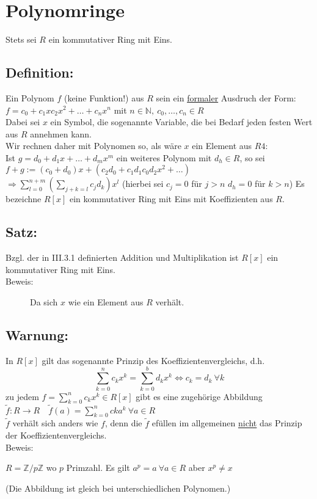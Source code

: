 \section{Polynomringe}
Stets sei $R$ ein kommutativer Ring mit Eins.
%
%
%
\subsection{Definition:}
Ein Polynom $f$ (keine Funktion!) aus $R$ sein ein \underline{formaler} Ausdruch der Form:\\
$f=c_{0}+c_{1}xc_{2}x^{2}+\dotsc+c_{n}x^{n}$ mit $n \in \mathbb{N}, \ c_{0}, \dotsc, c_{n} \in R$\\
Dabei sei $x$ ein Symbol, die sogenannte Variable, die bei Bedarf jeden festen Wert aus $R$ annehmen kann.\\
Wir rechnen daher mit Polynomen so, als wäre $x$ ein Element aus $R4$:\\
Ist $g=d_{0}+d_{1}x+\dotsc+d_{m}x^{m}$ ein weiteres Polynom mit $d_{h} \in R$, so sei \\
$f + g:=(c_{0}+d_{0})x + (c_{2}d_{0}+c_{1}d_{1}c_{0}d_{2}x^{2}+\dotsc)$\\
$\Rightarrow \sum\limits^{n+m}_{l=0}(\sum\limits_{j+k=l}c_{j}d_{k})x^{l}$
(hierbei sei $c_{j}=0$ für $j > n$  \quad $d_{h} = 0$ für $k > n$) Es bezeichne $R[x]$ ein kommutativer Ring mit Eins mit Koeffizienten aus $R$.
%
%
%
\subsection{Satz:}
Bzgl. der in III.3.1 definierten Addition und Multiplikation ist $R[x]$ ein kommutativer Ring mit Eins.\\
Beweis:
\begin{description}
	\item[] Da sich $x$ wie ein Element aus $R$ verhält.
\end{description}
%
%
%
\subsection{Warnung:}
In $R[x]$ gilt das sogenannte Prinzip des Koeffizientenvergleichs, d.h.
\begin{equation*}
\sum\limits^{n}_{k=0} c_{k} x^{k}= \sum\limits^{b}_{k=0} d_{k} x^{k} \Leftrightarrow c_{k} = d_{k} \ \forall k
\end{equation*}
zu jedem $f = \sum\limits^{n}_{k=0} c_{k} x^{k} \in R[x]$ gibt es eine zugehörige Abbildung$\tilde{f}:R \rightarrow R \quad \tilde{f}(a) = \sum\limits^{n}_{k=0} c{k} a^{k} \ \forall a \in R$\\
$\tilde{f}$ verhält sich anders wie $f$, denn die $\tilde{f}$ efüllen im allgemeinen \underline{nicht} das Prinzip der Koeffizientenvergleichs.\\
Beweis:
\begin{description}
	\item $R = \mathbb{Z}/p\mathbb{Z}$ wo $p$ Primzahl. Es gilt $a^{p}=a \ \forall a \in R$ aber $x^{p} \neq x$
\end{description}
(Die Abbildung ist gleich bei unterschiedlichen Polynomen.)
%
%
%
